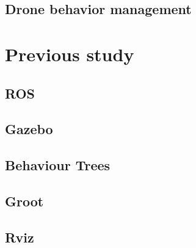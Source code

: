 \subsection{Drone behavior management}
\label{subsec:DroneBehaviorManagement}


\section{Previous study}
\label{sec:PreviousStudy}

\subsection{ROS}
\label{subsec:ROS}

\subsection{Gazebo}
\label{subsec:Gazebo}

\subsection{Behaviour Trees}
\label{subsec:BehaviourTrees}

\subsection{Groot}
\label{subsec:Groot}

\subsection{Rviz}
\label{subsec:Rviz}

\endinput
